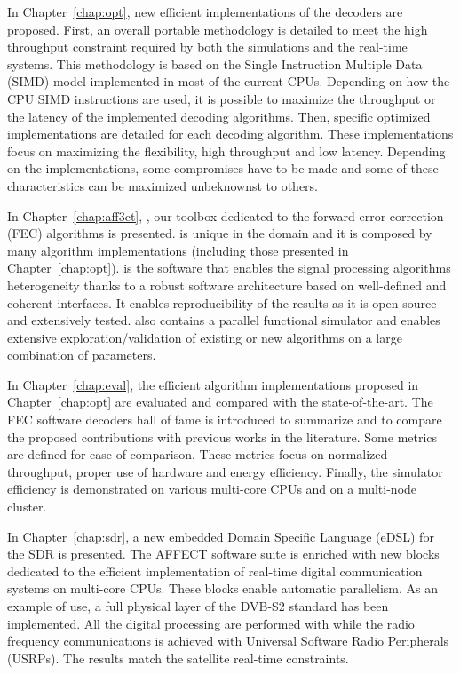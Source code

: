 In Chapter~\ref{chap:opt}, new efficient implementations of the decoders are
proposed. First, an overall portable methodology is detailed to meet the high
throughput constraint required by both the simulations and the real-time
systems. This methodology is based on the Single Instruction Multiple Data
(SIMD) model implemented in most of the current CPUs. Depending on how the CPU
SIMD instructions are used, it is possible to maximize the throughput or the
latency of the implemented decoding algorithms. Then, specific optimized
implementations are detailed for each decoding algorithm. These implementations
focus on maximizing the flexibility, high throughput and low latency. Depending
on the implementations, some compromises have to be made and some of these
characteristics can be maximized unbeknownst to others.

In Chapter~\ref{chap:aff3ct}, \AFFECT, our toolbox dedicated to the forward
error correction (FEC) algorithms is presented. \AFFECT is unique in the domain
and it is composed by many algorithm implementations (including those presented
in Chapter~\ref{chap:opt}). \AFFECT is the software that enables the signal
processing algorithms heterogeneity thanks to a robust software architecture
based on well-defined and coherent interfaces. It enables reproducibility of the
results as it is open-source and extensively tested. \AFFECT also contains a
parallel functional simulator and enables extensive exploration/validation of
existing or new algorithms on a large combination of parameters.

\newpage
In Chapter~\ref{chap:eval}, the efficient algorithm implementations proposed
in Chapter~\ref{chap:opt} are evaluated and compared with the state-of-the-art.
The FEC software decoders hall of fame is introduced to summarize and to compare
the proposed contributions with previous works in the literature. Some metrics
are defined for ease of comparison. These metrics focus on normalized
throughput, proper use of hardware and energy efficiency. Finally, the \AFFECT
simulator efficiency is demonstrated on various multi-core CPUs and on a
multi-node cluster.

In Chapter~\ref{chap:sdr}, a new embedded Domain Specific Language (eDSL) for
the SDR is presented. The AFFECT software suite is enriched with new blocks
dedicated to the efficient implementation of real-time digital communication
systems on multi-core CPUs. These blocks enable automatic parallelism. As an
example of use, a full physical layer of the DVB-S2 standard has been
implemented. All the digital processing are performed with \AFFECT while the
radio frequency communications is achieved with Universal Software Radio
Peripherals (USRPs). The results match the satellite real-time constraints.
